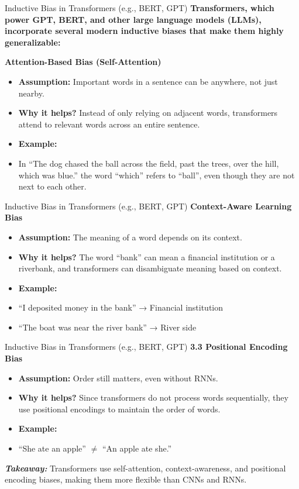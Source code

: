 \documentclass{beamer}
\begin{document}
\begin{frame}{Inductive Bias in Transformers (e.g., BERT, GPT)}
    \textbf{Transformers, which power GPT, BERT, and other large language models (LLMs), incorporate several modern inductive biases that make them highly generalizable:}
    
    \textbf{Attention-Based Bias (Self-Attention)}
    \begin{itemize}
        \item \textbf{Assumption:} Important words in a sentence can be anywhere, not just nearby.
        \item \textbf{Why it helps?} Instead of only relying on adjacent words, transformers attend to relevant words across an entire sentence.
        \item \textbf{Example:}
        \item In “The dog chased the ball across the field, past the trees, over the hill, which was blue.” the word “which” refers to “ball”, even though they are not next to each other.
    \end{itemize}
\end{frame} 

\begin{frame}{Inductive Bias in Transformers (e.g., BERT, GPT)}
    \textbf{Context-Aware Learning Bias}
    \begin{itemize}
        \item \textbf{Assumption:} The meaning of a word depends on its context.
        \item \textbf{Why it helps?} The word “bank” can mean a financial institution or a riverbank, and transformers can disambiguate meaning based on context.
        \item \textbf{Example:}
        \item “I deposited money in the bank” → Financial institution
        \item “The boat was near the river bank” → River side
    \end{itemize}
\end{frame} 

\begin{frame}{Inductive Bias in Transformers (e.g., BERT, GPT)}
    \textbf{3.3 Positional Encoding Bias}
    \begin{itemize}
        \item \textbf{Assumption:} Order still matters, even without RNNs.
        \item \textbf{Why it helps?} Since transformers do not process words sequentially, they use positional encodings to maintain the order of words.
        \item \textbf{Example:}
        \item “She ate an apple” \(\neq\) “An apple ate she.”
    \end{itemize}

    \textbf{\textit{Takeaway:}} Transformers use self-attention, context-awareness, and positional encoding biases, making them more flexible than CNNs and RNNs.
\end{frame}
\end{document}
